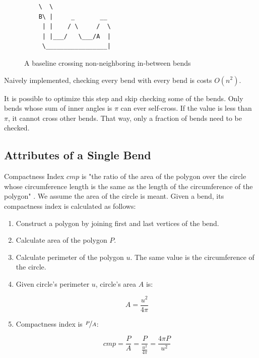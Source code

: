 \documentclass[a4paper]{article}
\begin{document}
\begin{figure}[h]
    \centering
    \begin{BVerbatim}
    \  \
    B\ |     _       __
     | |    / \     /  \
     | |___/   \___/A  |
     \_________________|
    \end{BVerbatim}
    \caption{A baseline crossing non-neighboring in-between bends}
    \label{fig:ascii-selfcross}
\end{figure}

Naively implemented, checking every bend with every bend is costs $O(n^2)$.

It is possible to optimize this step and skip checking some of the bends. Only
bends whose sum of inner angles is $\pi$ can ever self-cross. If the value is
less than $\pi$, it cannot cross other bends. That way, only a fraction of
bends need to be checked.

\subsection{Attributes of a Single Bend}

Compactness Index $cmp$ is "the ratio of the area of the polygon over the
circle whose circumference length is the same as the length of the
circumference of the polygon" \cite{wang1998line}. We assume the area of the
circle is meant. Given a bend, its compactness index is calculated as follows:

\begin{enumerate}

  \item Construct a polygon by joining first and last vertices of the bend.

  \item Calculate area of the polygon $P$.

  \item Calculate perimeter of the polygon $u$. The same value is the
    circumference of the circle.

  \item Given circle's perimeter $u$, circle's area $A$ is:

    \[
      A = \frac{u^2}{4\pi}
    \]

  \item Compactness index is $\nicefrac{P}{A}$:

    \[
      cmp = \frac{P}{A} = \frac{P}{ \frac{u^2}{4\pi} } = \frac{4\pi P}{u^2}
    \]

\end{enumerate}
\end{document}
